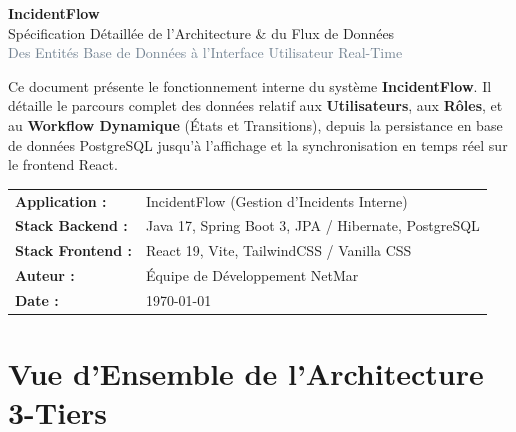 \documentclass[11pt,a4paper]{article}
\begin{document}
\begin{titlepage}
    \centering
    \vspace*{1.5cm}
    
    {\Huge \bfseries \textcolor{navyprimary}{IncidentFlow}}\\[0.4cm]
    {\Large \textcolor{blueaccent}{Spécification Détaillée de l'Architecture \& du Flux de Données}}\\[0.2cm]
    {\large \textcolor{slategray}{Des Entités Base de Données à l'Interface Utilisateur Real-Time}}\\[1.5cm]
    
    \begin{tcolorbox}[colback=blueaccent!5,colframe=blueaccent,arc=6pt,title=\textbf{Synthèse du Document}]
    Ce document présente le fonctionnement interne du système \textbf{IncidentFlow}. Il détaille le parcours complet des données relatif aux \textbf{Utilisateurs}, aux \textbf{Rôles}, et au \textbf{Workflow Dynamique} (États et Transitions), depuis la persistance en base de données PostgreSQL jusqu'à l'affichage et la synchronisation en temps réel sur le frontend React.
    \end{tcolorbox}

    \vfill
    
    \begin{tabular}{ll}
        \textbf{Application :} & IncidentFlow (Gestion d'Incidents Interne) \\
        \textbf{Stack Backend :} & Java 17, Spring Boot 3, JPA / Hibernate, PostgreSQL \\
        \textbf{Stack Frontend :} & React 19, Vite, TailwindCSS / Vanilla CSS \\
        \textbf{Auteur :} & Équipe de Développement NetMar \\
        \textbf{Date :} & \today \\
    \end{tabular}
    
    \vspace*{0.8cm}
\end{titlepage}

\tableofcontents
\newpage

\section{Vue d'Ensemble de l'Architecture 3-Tiers}
\end{document}

